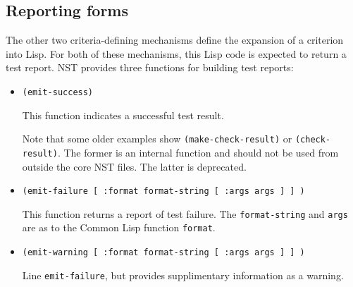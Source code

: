 \subsection{Reporting forms}
\label{sec:criteria-forms-report}
The other two criteria-defining mechanisms define the expansion of a
criterion into Lisp.  For both of these mechanisms, this Lisp code is
expected to return a test report.  NST provides three functions for
building test reports:
\begin{itemize}
\item\texttt{(emit-success)}\par This function indicates a successful
  test result.

  Note that some older examples show \texttt{(make-check-result)} or
  \texttt{(check-result)}.  The former is an internal function and
  should not be used from outside the core NST files.  The latter is
  deprecated.
\item\texttt{(emit-failure [ :format format-string [ :args args ] ] )}
  \par This function returns a report of test failure.  The
  \texttt{format-string} and \texttt{args} are as to the Common Lisp
  function \texttt{format}.
\item\texttt{(emit-warning [ :format format-string [ :args args ] ] )}
  \par Line \texttt{emit-failure}, but provides supplimentary
  information as a warning.
\end{itemize}

